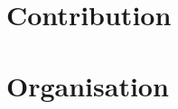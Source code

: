 \begin{comment}
Verifiable homomorphic secret sharing (VHASS) \cite{VHASS} is a protocol that verifies the servers computations is correct in homomorphic secret sharing protocol. 

\section{Previous work}
\cite{DRYNX}<- use for other similar approaches.


In this section the most relevant works which this paper builds upon will be briefly presented.
\subsection*{Verifiable additive homomorphic secret sharing}
This paper aims to extend the Verifiable additive homomorphic secret sharing (VHASS) construction presented in \cite{SumItUp} and further analysed in \cite{VHASS}, to also ensure honest clients. In this section we will give a brief review of their construction for VHASS  based on homomorphic hash functions to verify the servers computations. All details of this protocol can be found in the original paper \cite{SumItUp}.  

The aim of their protocol is to compute the sum $y=f(x_1,...,x_n)=\sum_{i=1}^n x_i$ of $n$ clients input denoted $x_i$ whiling keeping all $x_i$ secret and provide a proof $\sigma$ of the correctness of $y$. Each client split their secret $x_i$ between $m$ servers using homomorphic secret sharing, see section \ref{sec:secret_sharing}, such that no information about $x_i$ is obtained from any proper subset of the shares. The clients also computes and publishes $\tau_i=H(x_i+R_i)$, for a pseudorandom number $R_i$, $\tau_i$ will be used to verify the servers computations. Each servers computes the partial sum $y_j=\sum_{i=1}^n x_{ij}$ and a partial proof $\sigma_j$ and publishes $y_j$ and $\sigma_j$. Then any one can compute the sum of the clients input $y=\sum_{j=1}^m y_j$ and verify this sum is correct using $\sigma_j$ and $\tau_i$. This protocol assumes the clients are honest and does not provide any insurance that the clients input is correct and not malicious. 

\subsection*{Range Proofs}
Range proofs are used to verify that a value is withing a given range without reviling anything more about the value. 
Interactive / non-interactive. Move from general to wich one/ones we will cosider.

\end{comment}
\section{Contribution}
\section{Organisation}

